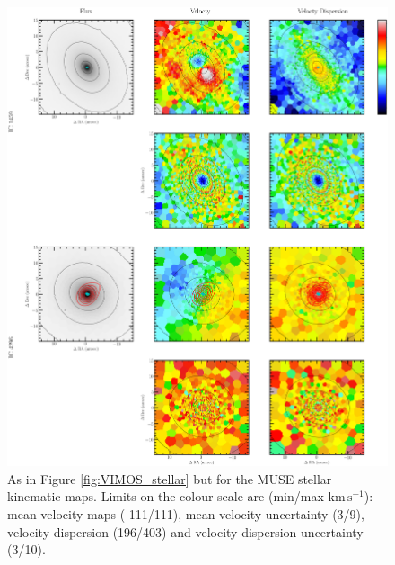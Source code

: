 		\begin{figure}
			\centering
			\includegraphics[height=0.62\textheight]{chapter4/muse/kin1.png}
			\caption[MUSE stellar kinematic maps]{As in Figure \ref{fig:VIMOS_stellar} but for the MUSE stellar kinematic maps. Limits on the colour scale are (min/max $\mathrm{km \, s^{-1}}$): mean velocity maps (-111/111), mean velocity uncertainty (3/9), velocity dispersion (196/403) and velocity dispersion uncertainty (3/10).}
			\label{fig:MUSE_stellar}
		\end{figure}
